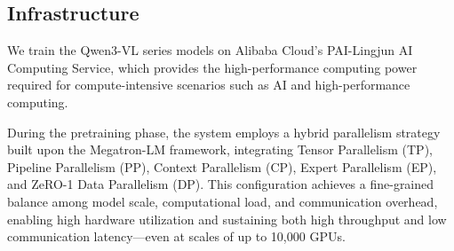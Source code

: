 \documentclass{article} %
\begin{document}
\subsection{Infrastructure}



We train the Qwen3-VL series models on Alibaba Cloud's PAI-Lingjun AI Computing Service, which provides the high-performance computing power required for compute-intensive scenarios such as AI and high-performance computing.

During the pretraining phase, the system employs a hybrid parallelism strategy built upon the Megatron-LM framework, integrating Tensor Parallelism (TP), Pipeline Parallelism (PP), Context Parallelism (CP), Expert Parallelism (EP), and ZeRO-1 Data Parallelism (DP). This configuration achieves a fine-grained balance among model scale, computational load, and communication overhead, enabling high hardware utilization and sustaining both high throughput and low communication latency—even at scales of up to 10,000 GPUs.
\end{document}
